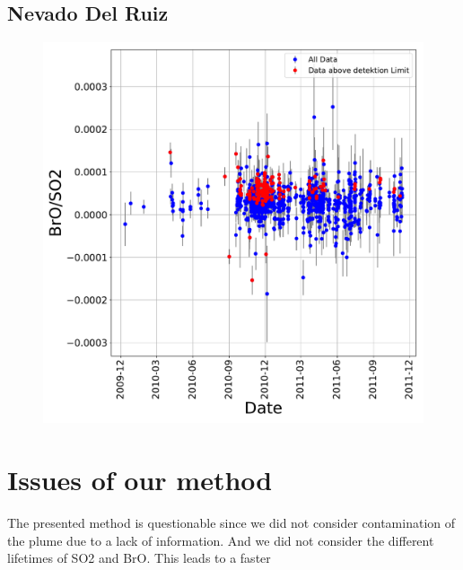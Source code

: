 \documentclass  [
  paper    = a4,
  BCOR     = 10mm,
  twoside,
  fontsize = 12pt,
  fleqn,
  toc      = bibnumbered,
  toc      = listofnumbered,
  numbers  = noendperiod,
  headings = normal,
  listof   = leveldown,
  version  = 3.03
]                                       {scrreprt}
\begin{document}
	\section{Nevado Del Ruiz}
		\begin{figure}
		\centering
		\includegraphics[width=0.7\linewidth]{"Bilder/Results/Results_NevadoDelRuiz (1)"}
		\caption{}
		\label{fig:resultsnevadodelruiz-1}
	\end{figure}
	\begin{small}	
%
%
 	
 \end{small}
	\chapter{Issues of our method}
	The presented method is questionable since we did not consider contamination of the plume due to a lack of information. And we did not consider the different lifetimes of SO2 and BrO. This leads to a faster 
	
\end{document}
